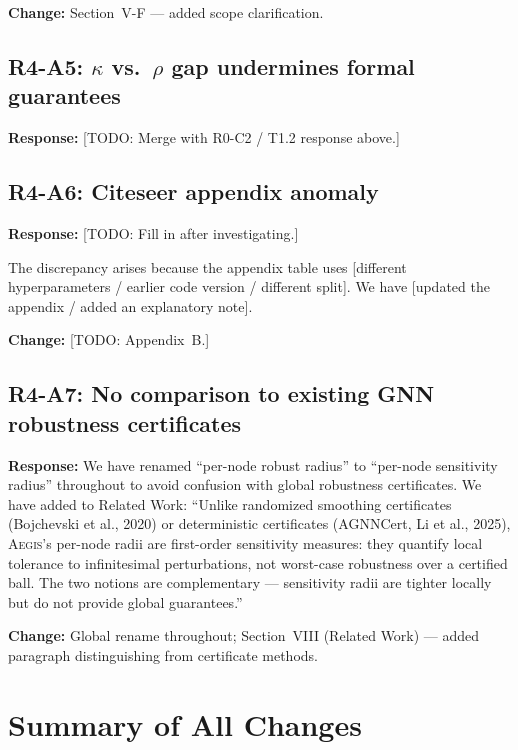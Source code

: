 \documentclass[11pt]{article}
\newcommand{\reviewer}[1]{\subsection*{\textcolor{revcolor}{#1}}}
\newcommand{\response}[1]{\textcolor{responsecolor}{\textbf{Response:} #1}}
\newcommand{\change}[1]{\textcolor{changecolor}{\textbf{Change:} #1}}
\newcommand{\AEGIS}{\textsc{Aegis}}
\begin{document}
\change{Section~V-F --- added scope clarification.}


\reviewer{R4-A5: $\kappa$ vs.\ $\rho$ gap undermines formal guarantees}

\response{[TODO: Merge with R0-C2 / T1.2 response above.]}


\reviewer{R4-A6: Citeseer appendix anomaly}

\response{
[TODO: Fill in after investigating.]

The discrepancy arises because the appendix table uses [different hyperparameters / earlier code version / different split]. We have [updated the appendix / added an explanatory note].
}

\change{[TODO: Appendix~B.]}


\reviewer{R4-A7: No comparison to existing GNN robustness certificates}

\response{
We have renamed ``per-node robust radius'' to ``per-node sensitivity radius'' throughout to avoid confusion with global robustness certificates. We have added to Related Work: ``Unlike randomized smoothing certificates (Bojchevski et al., 2020) or deterministic certificates (AGNNCert, Li et al., 2025), \AEGIS{}'s per-node radii are first-order sensitivity measures: they quantify local tolerance to infinitesimal perturbations, not worst-case robustness over a certified ball. The two notions are complementary --- sensitivity radii are tighter locally but do not provide global guarantees.''
}

\change{Global rename throughout; Section~VIII (Related Work) --- added paragraph distinguishing from certificate methods.}

\section*{Summary of All Changes}
\end{document}
